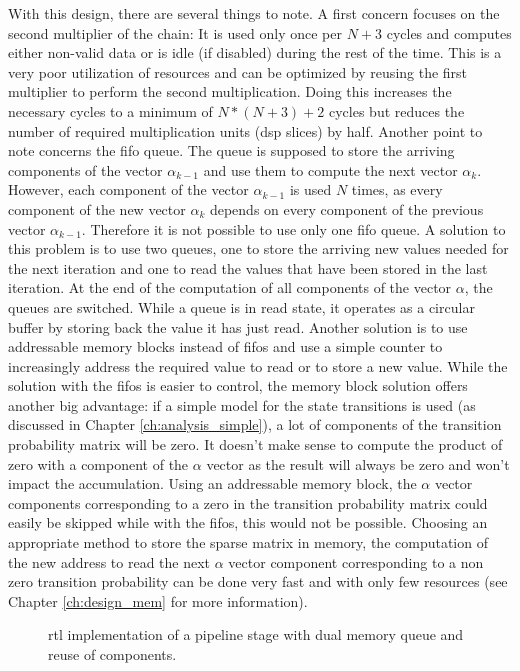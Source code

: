 \documentclass[mscthesis]{usiinfthesis}
\begin{document}
With this design, there are several things to note. A first concern focuses on
the second multiplier of the chain: It is used only once per $N+3$ cycles
and computes either non-valid data or is idle (if disabled) during the rest of
the time. This is a very poor utilization of resources and can be optimized by
reusing the first multiplier to perform the second multiplication. Doing this
increases the necessary cycles to a minimum of $N*(N+3)+2$ cycles but reduces
the number of required multiplication units (\gls{dsp} slices) by half. Another
point to note concerns the \gls{fifo} queue. The queue is supposed to store the
arriving components of the vector $\alpha_{k-1}$ and use them to compute the
next vector $\alpha_k$. However, each component of the vector $\alpha_{k-1}$ is
used $N$ times, as every component of the new vector $\alpha_k$ depends on
every component of the previous vector $\alpha_{k-1}$. Therefore it is not
possible to use only one \gls{fifo} queue. A solution to this problem is to use
two queues, one to store the arriving new values needed for the next iteration
and one to read the values that have been stored in the last iteration. At the
end of the computation of all components of the vector $\alpha$, the queues are
switched. While a queue is in read state, it operates as a circular buffer by
storing back the value it has just read. Another solution is to use addressable
memory blocks instead of \glspl{fifo} and use a simple counter to increasingly
address the required value to read or to store a new value. While the solution
with the \glspl{fifo} is easier to control, the memory block solution offers
another big advantage: if a simple model for the state transitions is used (as
discussed in Chapter \ref{ch:analysis_simple}), a lot of components of the
transition probability matrix will be zero. It doesn't make sense to compute
the product of zero with a component of the $\alpha$ vector as the result will
always be zero and won't impact the accumulation. Using an addressable memory
block, the $\alpha$ vector components corresponding to a zero in the transition
probability matrix could easily be skipped while with the \glspl{fifo}, this
would not be possible. Choosing an appropriate method to store the sparse
matrix in memory, the computation of the new address to read the next $\alpha$
vector component corresponding to a non zero transition probability can be done
very fast and with only few resources (see Chapter \ref{ch:design_mem} for more
information).

\begin{figure}
    \centering
    
    \caption{\acrshort{rtl} implementation of a pipeline stage with dual memory
        queue and reuse of components.}
    \label{fig:arch_step}
\end{figure}
\end{document}
